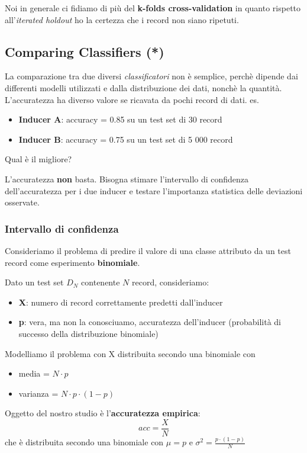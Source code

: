 Noi in generale ci fidiamo di pi\`u del \textbf{k-folds cross-validation} in quanto rispetto all'\textit{iterated holdout} ho la certezza che i record non siano ripetuti.

\subsection{Comparing Classifiers (*)}
La comparazione tra due diversi \textit{classificatori} non è semplice, perchè dipende dai differenti modelli utilizzati e dalla distribuzione dei dati, nonchè la quantità. L'accuratezza ha diverso valore se ricavata da pochi record di dati. 
es. 
\begin{itemize}
	\item \textbf{Inducer A}: accuracy = 0.85 su un test set di 30 record
	\item \textbf{Inducer B}: accuracy = 0.75 su un test set di 5 000 record
\end{itemize}
Qual è il migliore?

L'accuratezza \textbf{non} basta. Bisogna stimare l'intervallo di confidenza dell'accuratezza per i due inducer e testare l'importanza statistica delle deviazioni osservate.
 
\subsubsection{Intervallo di confidenza}
Consideriamo il problema di predire il valore di una classe attributo da un test record come esperimento \textbf{binomiale}.

Dato un test set $D_N$ contenente $N$ record, consideriamo:
\begin{itemize}
	\item \textbf{X}: numero di record correttamente predetti dall'inducer
	\item \textbf{p}: vera, ma non la conosciuamo, accuratezza dell'inducer (probabilità di successo della distribuzione binomiale)
\end{itemize}
Modelliamo il problema con X distribuita secondo una binomiale con
\begin{itemize}
	\item media = $N \cdot p$
	\item varianza = $N \cdot p \cdot (1-p)$
\end{itemize}
Oggetto del nostro studio \`e l'\textbf{accuratezza empirica}: \[acc = \frac{X}{N} \] 
che \`e distribuita secondo una binomiale con $\mu = p$ e $\sigma^2 = \frac{p \cdot (1-p)}{N}$

